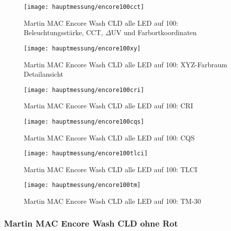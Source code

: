 \documentclass[pagesize,paper=A4,fontsize=12pt,utf8,numbers=noenddot,bibliography=totoc,listof=totoc,DIV=11,BCOR=1mm]{scrreprt}
\begin{document}
\begin{figure}[htp]     %
\centering
\texttt{[image: hauptmessung/encore100cct]} 
\caption {Martin MAC Encore Wash CLD alle LED auf 100: Beleuchtungsstärke, CCT, $\Delta$UV und Farbortkoordinaten} 
\end{figure}

\begin{figure}[htp]     %
\centering
\texttt{[image: hauptmessung/encore100xy]} 
\caption {Martin MAC Encore Wash CLD alle LED auf 100: XYZ-Farbraum Detailansicht} 
\end{figure}

\begin{figure}[htp]     %
\centering
\texttt{[image: hauptmessung/encore100cri]} 
\caption {Martin MAC Encore Wash CLD alle LED auf 100: CRI} 
\end{figure}

\begin{figure}[htp]     %
\centering
\texttt{[image: hauptmessung/encore100cqs]} 
\caption {Martin MAC Encore Wash CLD alle LED auf 100: CQS} 
\end{figure}

\begin{figure}[htp]     %
\centering
\texttt{[image: hauptmessung/encore100tlci]} 
\caption {Martin MAC Encore Wash CLD alle LED auf 100: TLCI} 
\end{figure}

\begin{figure}[htp]     %
\centering
\texttt{[image: hauptmessung/encore100tm]} 
\caption {Martin MAC Encore Wash CLD alle LED auf 100: TM-30} 
\end{figure}

\subsubsection{Martin MAC Encore Wash CLD ohne Rot}
\end{document}
